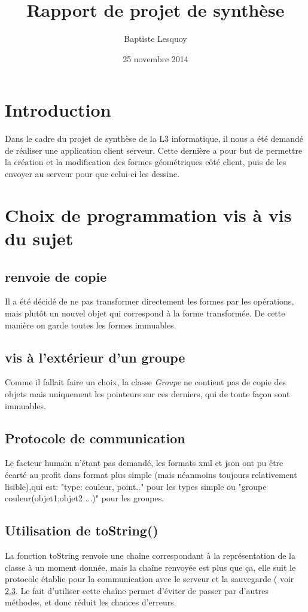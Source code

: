 \documentclass[10pt,a4paper]{report}
\author{Baptiste Lesquoy}
\title{Rapport de projet de synthèse}
\date{25 novembre 2014}
\begin{document}
\begin{spacing}{0.8}

\maketitle
\newpage


\tableofcontents
\newpage

\chapter{Introduction}
Dans le cadre du projet de synthèse de la L3 informatique, il nous a été demandé de réaliser une application client serveur. Cette dernière a pour but de permettre la création et la modification des formes géométriques côté client, puis de les envoyer au serveur pour que celui-ci les dessine.


\chapter{Choix de programmation vis à vis du sujet}

\section{renvoie de copie}
Il a été décidé de ne pas transformer directement les formes par les opérations, mais plutôt un nouvel objet qui correspond à la forme transformée. De cette manière on garde toutes les formes immuables.

\section{vis à l'extérieur d'un groupe}
Comme il fallait faire un choix, la classe \textit{Groupe} ne contient pas de copie des objets mais uniquement les pointeurs sur ces derniers, qui de toute façon sont immuables.
\section{Protocole de communication}\label{protocole}
Le facteur humain n'étant pas demandé, les formats xml et json ont pu être écarté au profit dans format plus simple (mais néanmoins toujours relativement lisible),qui est: "type: couleur, point.." pour les types simple ou "groupe couleur(objet1;objet2 ...)" pour les groupes.

\section{Utilisation de toString()}\label{toString}
La fonction toString renvoie une chaîne correspondant à la représentation de la classe à un moment donnée, mais la chaîne renvoyée est plus que ça, elle suit le protocole établie pour la communication avec le serveur et la sauvegarde ( voir \ref{protocole}. Le fait d'utiliser cette chaîne permet d'éviter de passer par d'autres méthodes, et donc réduit les chances d'erreurs.


\end{spacing}
\end{document}
